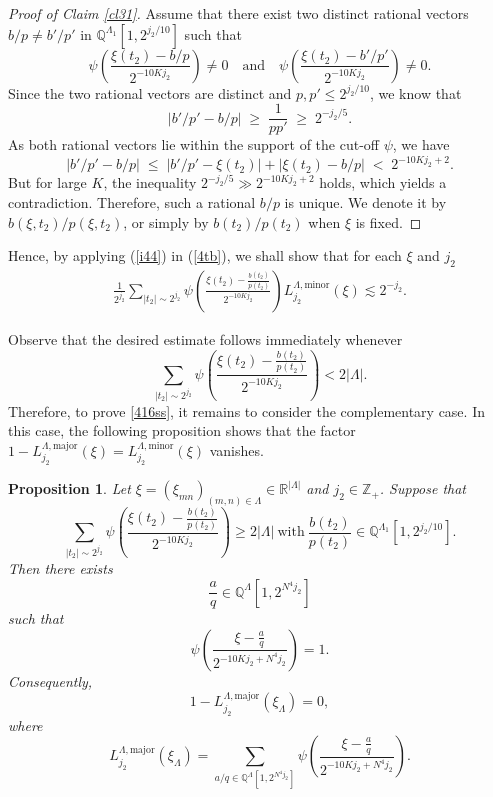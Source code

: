 \documentclass[11 pt,letterpaper]{amsart}
\theoremstyle{plain}
\newtheorem{proposition}{Proposition}\numberwithin{proposition}{section}
\theoremstyle{definition}
\theoremstyle{remark} \theoremstyle{exam} \theoremstyle{ob}
\numberwithin{equation}{section}
\begin{document}
 

\begin{proof}[Proof of Claim \ref{cl31}]
  Assume that there exist two distinct rational vectors $b/p \neq b'/p'$ in $\mathbb{Q}^{\Lambda_1}[1,2^{j_2/10}] $ such that
\[
\psi\!\left(\frac{\xi(t_2)-b/p}{2^{-10K j_2}}\right)\neq 0
\quad \text{and} \quad 
\psi\!\left(\frac{\xi(t_2)-b'/p'}{2^{-10K j_2}}\right)\neq 0.
\]
Since the two rational vectors are distinct and  $p,p'\le 2^{j_2/10}$, we know that
\[
|b'/p' - b/p| \;\ge\; \frac{1}{pp'} \;\ge\; 2^{-j_2/5}.
\]
As both rational vectors lie within the support of the cut-off $\psi$, we  have
\[
|b'/p' - b/p|
\;\le\; |b'/p' - \xi(t_2)| + |\xi(t_2)-b/p|
\;<\; 2^{-10K j_2 + 2}.
\]
But for large $K$, the inequality $2^{-j_2/5} \gg 2^{-10K j_2 + 2}$ holds, which yields a contradiction. 
Therefore, such a rational $b/p$ is unique. We denote it by $b(\xi,t_2)/p(\xi,t_2)$, or simply by $b(t_2)/p(t_2)$ when $\xi$ is fixed. 
\end{proof} 
Hence,  by applying  (\ref{i44})  in (\ref{4tb}),
we shall show that  for each $\xi$ and $j_2$ 
\begin{align} \label{416ss}
  \frac{1}{2^{j_2}}
\sum_{|t_2|\sim 2^{j_2}}
\psi\!\left(
\frac{\xi(t_2)-\frac{b(t_2)}{p(t_2)}}{2^{-10Kj_2}}
\right)
L^{\Lambda,\mathrm{minor}}_{j_2}(\xi)
\lesssim 2^{-j_2}.
\end{align}
  

Observe that the desired estimate follows immediately whenever
\[
\sum_{|t_2|\sim 2^{j_2}}
\psi\!\left(
\frac{\xi(t_2)-\frac{b(t_2)}{p(t_2)}}{2^{-10Kj_2}}
\right)
<2|\Lambda|.
\]
   Therefore,  to prove \eqref{416ss}, it remains to consider the complementary case. In this case, the following proposition shows that the factor
$1-L^{\Lambda,\mathrm{major}}_{j_2}(\xi) =L^{\Lambda,\mathrm{minor}}_{j_2}(\xi) $ vanishes.

\begin{proposition}\label{prop6100}
Let $\xi=(\xi_{mn})_{(m,n)\in\Lambda}\in\mathbb R^{|\Lambda|}$ and
$j_2\in\mathbb Z_+$. Suppose that
\begin{equation}\label{420s}
\sum_{|t_2|\sim 2^{j_2}}
\psi\!\left(
\frac{\xi(t_2)-\frac{b(t_2)}{p(t_2)}}{2^{-10Kj_2}}
\right)
\ge 2|\Lambda|
\ \text{with} \
\frac{b(t_2)}{p(t_2)}
\in\mathbb Q^{\Lambda_1}[1,2^{j_2/10}].
\end{equation}
Then there exists
\[
\frac{a}{q}\in\mathbb Q^\Lambda[1,2^{N^4j_2}]
\]
such that
\begin{equation}\label{pkn}
\psi\!\left(
\frac{\xi-\frac{a}{q}}{2^{-10Kj_2+N^4j_2}}
\right)=1.
\end{equation}
Consequently,
\[
1-L^{\Lambda,\mathrm{major}}_{j_2}(\xi_\Lambda)=0,
\]
where
\[
L^{\Lambda,\mathrm{major}}_{j_2}(\xi_\Lambda)
=
\sum_{a/q\in\mathbb Q^\Lambda[1,2^{N^4j_2}]}
\psi\!\left(
\frac{\xi-\frac{a}{q}}{2^{-10Kj_2+N^4j_2}}
\right).
\]
\end{proposition}
 
\end{document}
